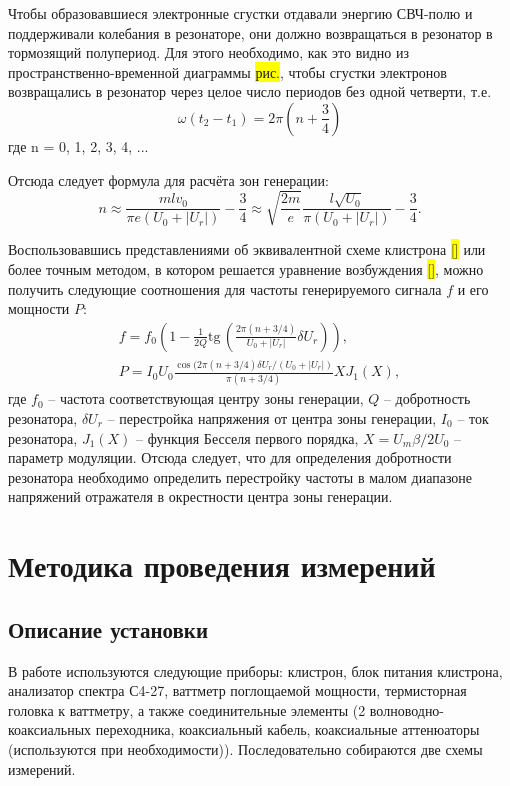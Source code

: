 \documentclass[a4paper,14pt]{extarticle}
\renewcommand{\tan}{\mathrm{tg\,}}
\begin{document}
	Чтобы  образовавшиеся  электронные  сгустки  отдавали  энергию  СВЧ-полю и поддерживали колебания в резонаторе, они должно возвращаться в резонатор в тормозящий полупериод. Для этого необходимо, как это видно из пространственно-временной диаграммы \colorbox{yellow}{рис.},  чтобы  сгустки  электронов  возвращались  в  резонатор  через целое число периодов без одной четверти, т.е. 
	$$ \omega (t_2 - t_1) = 2\pi \left(n + \frac{3}{4}\right)$$
	где n = 0, 1, 2, 3, 4, ... 
	
	Отсюда следует формула для расчёта зон генерации:
	\begin{equation}
	n \approx \frac{mlv_0}{\pi e(U_0 + |U_r|)} - \frac{3}{4} \approx \sqrt{\frac{2m}{e}}\frac{l\sqrt{U_0}}{\pi (U_0 + |U_r|)} - \frac{3}{4}.
    \label{eq:n}
	\end{equation}
	
	Воспользовавшись представлениями об эквивалентной схеме клистрона \colorbox{yellow}{[]} или более точным методом, в котором решается уравнение возбуждения \colorbox{yellow}{[]}, можно получить следующие соотношения для частоты генерируемого сигнала $f$ и его мощности $P$:
	\begin{gather}
	f = f_0 \left(1 - \frac{1}{2Q} \tan \left( \frac{2\pi(n + 3/4)}{U_0 + |U_r|} \delta U_r \right)\right), \label{eq:Q}\\
	P = I_0 U_0 \frac{\cos (2\pi (n + 3/4)\delta U_r/(U_0 + |U_r|)}{\pi (n + 3/4)} X J_1(X),
	\end{gather}
	где $f_0$ -- частота соответствующая центру зоны генерации, $Q$ -- добротность резонатора, $\delta U_r$ -- перестройка напряжения от центра зоны генерации, $I_0$ -- ток резонатора, $J_1(X)$ -- функция Бесселя первого порядка, $X = U_m\beta/2U_0$ -- параметр модуляции. Отсюда следует, что для определения добротности резонатора необходимо определить перестройку частоты в малом диапазоне напряжений отражателя в окрестности центра зоны генерации.
	
	\section{Методика проведения измерений}
	\subsection{Описание установки}
	В работе используются следующие приборы: клистрон, блок питания клистрона, анализатор спектра С4-27, ваттметр поглощаемой мощности, термисторная головка к ваттметру, а также соединительные элементы (2 волноводно-коаксиальных переходника, коаксиальный кабель,  коаксиальные аттенюаторы (используются при необходимости)). Последовательно собираются две схемы измерений.
	
\end{document}
